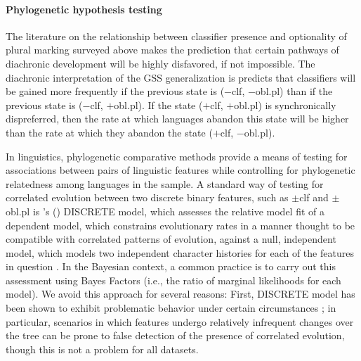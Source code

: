 \documentclass[11pt]{article}
\def\citeapos#1{\citeauthor{#1}'s (\citeyear{#1})}
\begin{document}
{\color{green}
\paragraph{Phylogenetic hypothesis testing}

The literature on the relationship between classifier presence and optionality of plural marking surveyed above makes the prediction that certain pathways of diachronic development will be highly disfavored, if not impossible. 
The diachronic interpretation of the GSS generalization is predicts that classifiers will be gained more frequently if the previous state is {\sc ($-$clf, $-$obl.pl)} than if the previous state is {\sc ($-$clf, $+$obl.pl)}. 
If the state {\sc ($+$clf, $+$obl.pl)} is synchronically dispreferred, then the rate at which languages abandon this state will be higher than the rate at which they abandon the state {\sc ($+$clf, $-$obl.pl)}.

In linguistics, phylogenetic comparative methods provide a means of testing for associations between pairs of linguistic features while controlling for phylogenetic relatedness among languages in the sample. 
A standard way of testing for correlated evolution between two discrete binary features, such as {\sc $\pm$clf} and {\sc $\pm$obl.pl} is \citeapos{Pagel1994} DISCRETE model, which assesses the relative model fit of a dependent model, which constrains evolutionary rates in a manner thought to be compatible with correlated patterns of evolution, against a null, independent model, which models two independent character histories for each of the features in question \citep{PagelMeade2006,Dunnetal2011}. 
In the Bayesian context, a common practice is to carry out this assessment using Bayes Factors (i.e., the ratio of marginal likelihoods for each model). We avoid this approach for several reasons: 
First, DISCRETE model has been shown to exhibit problematic behavior under certain circumstances \citep{MaddisonFitzjohn2014}; in particular, scenarios in which features undergo relatively infrequent changes over the tree can be prone to false detection of the presence of correlated evolution, though this is not a problem for all datasets.

}
\end{document}

